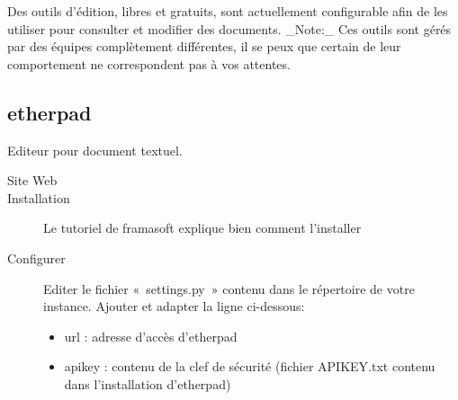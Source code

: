 \documentclass[a4paper,10pt,oneside,french]{sphinxmanual}
\begin{document}
Des outils d’édition, libres et gratuits, sont actuellement configurable afin de les utiliser pour consulter et modifier des documents.
\_Note:\_ Ces outils sont gérés par des équipes complètement différentes, il se peux que certain de leur comportement ne correspondent pas à vos attentes.


\subsection{etherpad}
\label{\detokenize{documents/editor:etherpad}}
Editeur pour document textuel.
\begin{description}
\item[{Site Web}] \leavevmode
{}

\item[{Installation}] \leavevmode
Le tutoriel de framasoft explique bien comment l’installer

\item[{Configurer}] \leavevmode
Editer le fichier « settings.py » contenu dans le répertoire de votre instance.
Ajouter et adapter la ligne ci-dessous:
\begin{itemize}
\item {} 
url : adresse d’accès d’etherpad

\item {} 
apikey : contenu de la clef de sécurité (fichier APIKEY.txt contenu dans l’installation d’etherpad)

\end{itemize}

\end{description}
\end{document}

